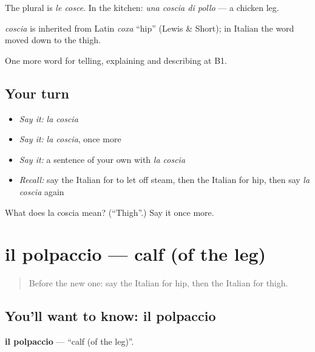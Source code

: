 The plural is \emph{le cosce}. In the kitchen: \emph{una coscia di pollo} — a chicken leg.

\begin{cousinweb}
\emph{coscia} is inherited from Latin \emph{coxa} \textquotedblleft{}hip\textquotedblright{} (Lewis \& Short); in Italian the word moved down to the thigh.
\end{cousinweb}

\begin{grammarlens}[title={What you've built}]
One more word for telling, explaining and describing at B1.
\end{grammarlens}

\subsection*{Your turn}
\begin{itemize}
\raggedright
  \item \emph{Say it:} \emph{la coscia}
  \item \emph{Say it:} \emph{la coscia}, once more
  \item \emph{Say it:} a sentence of your own with \emph{la coscia}
  \item \emph{Recall:} say the Italian for to let off steam, then the Italian for hip, then say \emph{la coscia} again
\end{itemize}

\begin{tcolorbox}[breakable,colback=teal!4,colframe=teal!35!black,title={Before you move on}]
What does la coscia mean? (\textquotedblleft{}Thigh\textquotedblright{}.) Say it once more.
\end{tcolorbox}
\section[il polpaccio]{il polpaccio — calf (of the leg)}

\label{lesson:IT-C481-polpaccio}



\begin{quote}
Before the new one: say the Italian for hip, then the Italian for thigh.
\end{quote}

\subsection*{You'll want to know: il polpaccio}
\textbf{il polpaccio} — \textquotedblleft{}calf (of the leg)\textquotedblright{}.

